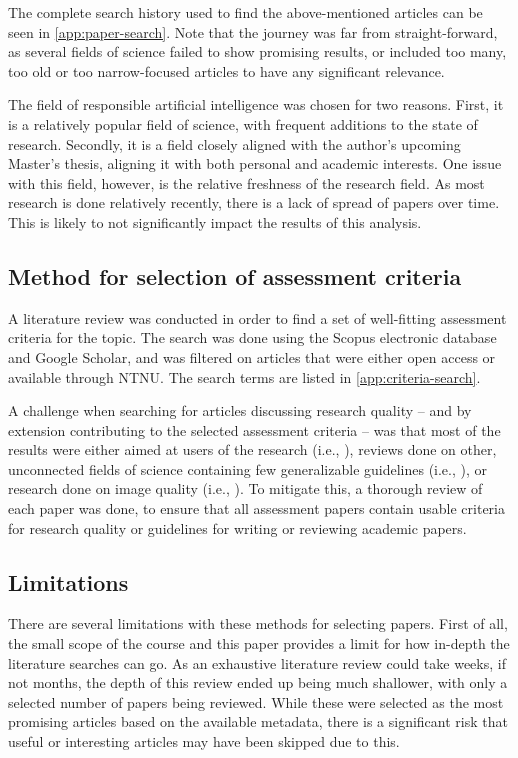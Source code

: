 The complete search history used to find the above-mentioned articles can be seen in \autoref{app:paper-search}. Note that the journey was far from straight-forward, as several fields of science failed to show promising results, or included too many, too old or too narrow-focused articles to have any significant relevance.

The field of responsible artificial intelligence was chosen for two reasons. First, it is a relatively popular field of science, with frequent additions to the state of research. Secondly, it is a field closely aligned with the author's upcoming Master's thesis, aligning it with both personal and academic interests. One issue with this field, however, is the relative freshness of the research field. As most research is done relatively recently, there is a lack of spread of papers over time. This is likely to not significantly impact the results of this analysis.

\subsection{Method for selection of assessment criteria}
\label{sec:criteria-selection}
A literature review was conducted in order to find a set of well-fitting assessment criteria for the topic. The search was done using the Scopus electronic database and Google Scholar, and was filtered on articles that were either open access or available through NTNU. The search terms are listed in \autoref{app:criteria-search}.

A challenge when searching for articles discussing research quality -- and by extension contributing to the selected assessment criteria -- was that most of the results were either aimed at users of the research (i.e., \cite{Mayhew_1993,Domholdt_1985}), reviews done on other, unconnected fields of science containing few generalizable guidelines (i.e., \cite{Wade_2004,Biddle_2011,Polanczyk_2015}), or research done on image quality (i.e., \cite{Wang_2002,Mittal_2012}). To mitigate this, a thorough review of each paper was done, to ensure that all assessment papers contain usable criteria for research quality or guidelines for writing or reviewing academic papers.

\subsection{Limitations}
There are several limitations with these methods for selecting papers. First of all, the small scope of the course and this paper provides a limit for how in-depth the literature searches can go. As an exhaustive literature review could take weeks, if not months, the depth of this review ended up being much shallower, with only a selected number of papers being reviewed. While these were selected as the most promising articles based on the available metadata, there is a significant risk that useful or interesting articles may have been skipped due to this.


